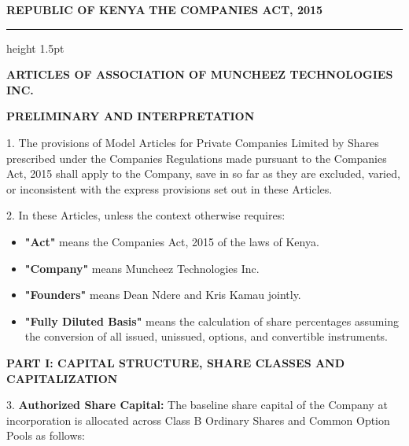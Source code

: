\documentclass[11pt,a4paper]{article}
\begin{document}
\newpage
\pagestyle{plain}

{\fontsize{18}{22}\sffamily\bfseries\color{CorporateNavy} REPUBLIC OF KENYA} \newline
{\fontsize{14}{18}\sffamily\bfseries\color{LinkBlue} THE COMPANIES ACT, 2015}

\vspace{0.2cm}
\color{RuleNavy}\hrule height 1.5pt
\vspace{0.4cm}

{\fontsize{16}{20}\sffamily\bfseries\color{CorporateNavy} ARTICLES OF ASSOCIATION OF MUNCHEEZ TECHNOLOGIES INC.}

\vspace{0.4cm}
\textbf{\color{CorporateNavy} PRELIMINARY AND INTERPRETATION}

1. The provisions of Model Articles for Private Companies Limited by Shares prescribed under the Companies Regulations made pursuant to the Companies Act, 2015 shall apply to the Company, save in so far as they are excluded, varied, or inconsistent with the express provisions set out in these Articles.

2. In these Articles, unless the context otherwise requires:
\begin{itemize}
    \item \textbf{"Act"} means the Companies Act, 2015 of the laws of Kenya.
    \item \textbf{"Company"} means Muncheez Technologies Inc.
    \item \textbf{"Founders"} means Dean Ndere and Kris Kamau jointly.
    \item \textbf{"Fully Diluted Basis"} means the calculation of share percentages assuming the conversion of all issued, unissued, options, and convertible instruments.
\end{itemize}

\vspace{0.4cm}
\textbf{\color{CorporateNavy} PART I: CAPITAL STRUCTURE, SHARE CLASSES AND CAPITALIZATION}

3. \textbf{Authorized Share Capital:} The baseline share capital of the Company at incorporation is allocated across Class B Ordinary Shares and Common Option Pools as follows:
\end{document}
